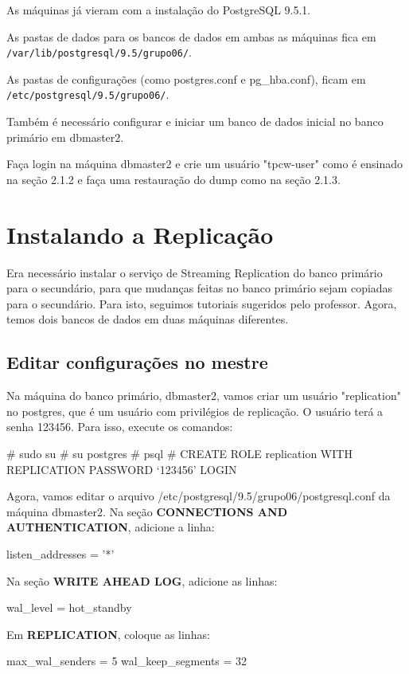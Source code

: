 \documentclass[a4paper,10pt]{article}
\begin{document}
    As máquinas já vieram com a instalação do PostgreSQL 9.5.1.

    As pastas de dados para os bancos de dados em ambas as máquinas fica em \verb|/var/lib/postgresql/9.5/grupo06/|.

    As pastas de configurações (como postgres.conf e pg\_hba.conf), ficam em \verb|/etc/postgresql/9.5/grupo06/|.

    Também é necessário configurar e iniciar um banco de dados inicial no banco primário em dbmaster2.

    Faça login na máquina dbmaster2 e crie um usuário "tpcw-user" como é ensinado na seção 2.1.2 e faça uma restauração do dump como na seção 2.1.3.

\section{Instalando a Replicação}
    Era necessário instalar o serviço de Streaming Replication do banco primário para o secundário, para que mudanças feitas no banco primário sejam copiadas para o secundário. Para isto, seguimos tutoriais sugeridos pelo professor.
    Agora, temos dois bancos de dados em duas máquinas diferentes.
    \subsection{Editar configurações no mestre}
      Na máquina do banco primário, dbmaster2, vamos criar um usuário "replication" no postgres, que é um usuário com privilégios de replicação. O usuário terá a senha 123456. Para isso, execute os comandos:
      \begin{spverbatim}
      # sudo su
      # su postgres
      # psql
      # CREATE ROLE replication WITH REPLICATION PASSWORD ‘123456’ LOGIN
      \end{spverbatim}

      Agora, vamos editar o arquivo /etc/postgresql/9.5/grupo06/postgresql.conf da máquina dbmaster2.
      Na seção \textbf{CONNECTIONS AND AUTHENTICATION}, adicione a linha:
      \begin{spverbatim}
      listen_addresses = '*'
      \end{spverbatim}

      Na seção \textbf{WRITE AHEAD LOG}, adicione as linhas:
      \begin{spverbatim}
      wal_level = hot_standby
      \end{spverbatim}

      Em \textbf{REPLICATION}, coloque as linhas:
      \begin{spverbatim}
      max_wal_senders = 5
      wal_keep_segments = 32
      \end{spverbatim}
\end{document}
